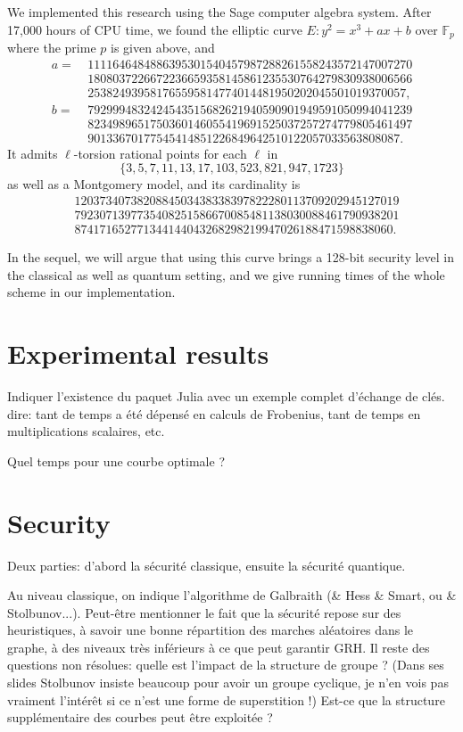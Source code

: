 \documentclass{article}
\newcommand{\F}{\mathbb{F}}
\theoremstyle{definition}
\begin{document}
We implemented this research using the Sage computer algebra system.
After 17,000 hours of CPU time, we found the elliptic curve
$
	E : y^2 = x^3 + ax + b
$
over $\F_p$ where the prime $p$ is given above, and
\[
\begin{aligned}
a =\ & 1111646484886395301540457987288261558243572147007270 \\ 
& 1808037226672236659358145861235530764279830938006566 \\
& 253824939581765595814774014481950202045501019370057,\\
b =\ & 7929994832424543515682621940590901949591050994041239 \\
& 8234989651750360146055419691525037257274779805461497 \\ 
& 90133670177545414851226849642510122057033563808087.
\end{aligned}
\]
It admits $\ell$-torsion rational points for each $\ell$ in
\[
  \{3, 5, 7, 11, 13, 17, 103, 523, 821, 947, 1723\}
\]
as well as a Montgomery model, and its cardinality is
\[
\begin{aligned}
& 1203734073820884503438338397822280113709202945127019 \\ 
& 7923071397735408251586670085481138030088461790938201 \\
& 874171652771344144043268298219947026188471598838060.
\end{aligned}
\]

In the sequel, we will argue that using this curve brings a 128-bit security level
in the classical as well as quantum setting, and we give running times of the whole
scheme in our implementation.

\section{Experimental results}
\label{sec:exp}

Indiquer l'existence du paquet Julia avec un exemple complet d'échange
de clés. dire: tant de temps a été dépensé en
calculs de Frobenius, tant de temps en multiplications scalaires, etc.

Quel temps pour une courbe optimale ?

\section{Security}

Deux parties: d'abord la sécurité classique, ensuite la sécurité quantique.

Au niveau classique, on indique l'algorithme de Galbraith (\& Hess \&
Smart, ou \& Stolbunov...). Peut-être mentionner le fait que la
sécurité repose sur des heuristiques, à savoir une bonne répartition
des marches aléatoires dans le graphe, à des niveaux très inférieurs à
ce que peut garantir GRH.  Il reste des questions non résolues: quelle
est l'impact de la structure de groupe ? (Dans ses slides Stolbunov
insiste beaucoup pour avoir un groupe cyclique, je n'en vois pas
vraiment l'intérêt si ce n'est une forme de superstition !)  Est-ce
que la structure supplémentaire des courbes peut être exploitée ?
\end{document}
